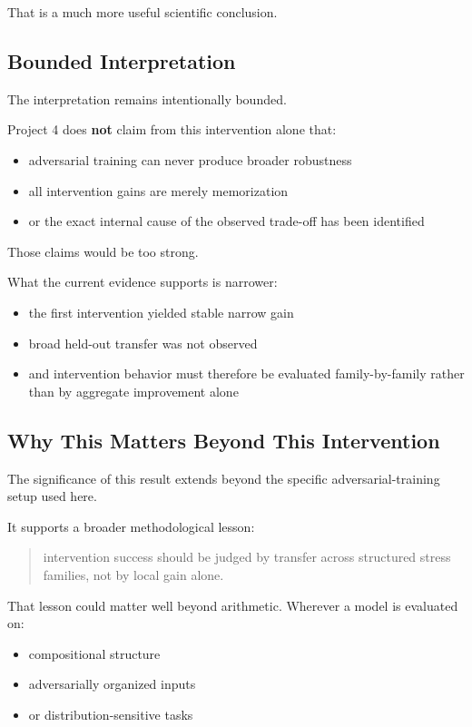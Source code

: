 \documentclass[11pt]{article}
\begin{document}
That is a much more useful scientific conclusion.

\subsection{Bounded Interpretation}

The interpretation remains intentionally bounded.

Project 4 does \textbf{not} claim from this intervention alone that:
\begin{itemize}[leftmargin=1.5em]
    \item adversarial training can never produce broader robustness
    \item all intervention gains are merely memorization
    \item or the exact internal cause of the observed trade-off has been identified
\end{itemize}

Those claims would be too strong.

What the current evidence supports is narrower:
\begin{itemize}[leftmargin=1.5em]
    \item the first intervention yielded stable narrow gain
    \item broad held-out transfer was not observed
    \item and intervention behavior must therefore be evaluated family-by-family rather than by aggregate improvement alone
\end{itemize}

\subsection{Why This Matters Beyond This Intervention}

The significance of this result extends beyond the specific adversarial-training setup used here.

It supports a broader methodological lesson:

\begin{quote}
intervention success should be judged by transfer across structured stress families, not by local gain alone.
\end{quote}

That lesson could matter well beyond arithmetic. Wherever a model is evaluated on:
\begin{itemize}[leftmargin=1.5em]
    \item compositional structure
    \item adversarially organized inputs
    \item or distribution-sensitive tasks
\end{itemize}
\end{document}
